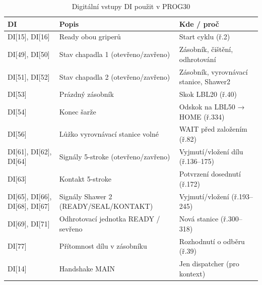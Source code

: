 \begin{table}[H]
  \centering
  \caption{Digitální vstupy DI použit v PROG30}
  \begin{tabular}{lll}
    \toprule
    DI & Popis & Kde / proč \\
    \midrule
    DI[15], DI[16] & Ready obou griperů & Start cyklu (ř.2) \\
    DI[49], DI[50] & Stav chapadla 1 (otevřeno/zavřeno) & Zásobník, čištění, odhrotování \\
    DI[51], DI[52] & Stav chapadla 2 (otevřeno/zavřeno) & Zásobník, vyrovnávací stanice, Shawer2 \\
    DI[53] & Prázdný zásobník & Skok LBL20 (ř.40) \\
    DI[54] & Konec šarže & Odskok na LBL50 → HOME (ř.334) \\
    DI[56] & Lůžko vyrovnávací stanice volné & WAIT před založením (ř.82) \\
    DI[61], DI[62], DI[64] & Signály 5-stroke (otevřeno/zavřeno) & Vyjmutí/vložení dílu (ř.136–175) \\
    DI[63] & Kontakt 5-stroke & Potvrzení dosednutí (ř.172) \\
    DI[65], DI[66], DI[68], DI[67] & Signály Shawer 2 (READY/SEAL/KONTAKT) & Vyjmutí/vložení (ř.193–245) \\
    DI[69], DI[71] & Odhrotovací jednotka READY / sevřeno & Nová stanice (ř.300–318) \\
    DI[77] & Přítomnost dílu v zásobníku & Rozhodnutí o odběru (ř.39) \\
    DI[14] & Handshake MAIN & Jen dispatcher (pro kontext) \\
    \bottomrule
  \end{tabular}
\end{table}

